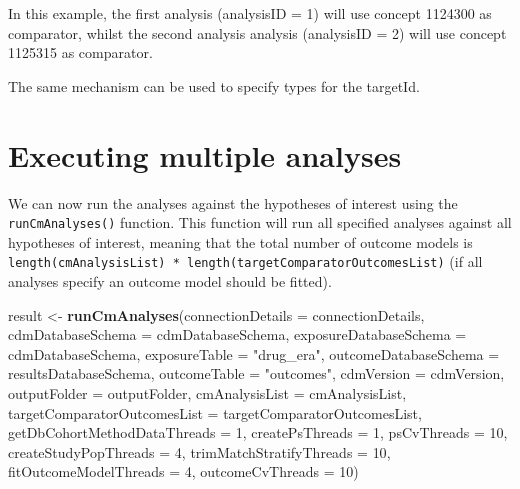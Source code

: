 \documentclass[
]{article}
\newenvironment{Shaded}{\begin{snugshade}}{\end{snugshade}}
\newcommand{\DataTypeTok}[1]{\textcolor[rgb]{0.13,0.29,0.53}{#1}}
\newcommand{\DecValTok}[1]{\textcolor[rgb]{0.00,0.00,0.81}{#1}}
\newcommand{\KeywordTok}[1]{\textcolor[rgb]{0.13,0.29,0.53}{\textbf{#1}}}
\newcommand{\NormalTok}[1]{#1}
\newcommand{\StringTok}[1]{\textcolor[rgb]{0.31,0.60,0.02}{#1}}
\begin{document}
In this example, the first analysis (analysisID = 1) will use concept
1124300 as comparator, whilst the second analysis analysis (analysisID =
2) will use concept 1125315 as comparator.

The same mechanism can be used to specify types for the targetId.

\hypertarget{executing-multiple-analyses}{%
\section{Executing multiple
analyses}\label{executing-multiple-analyses}}

We can now run the analyses against the hypotheses of interest using the
\texttt{runCmAnalyses()} function. This function will run all specified
analyses against all hypotheses of interest, meaning that the total
number of outcome models is
\texttt{length(cmAnalysisList)\ *\ length(targetComparatorOutcomesList)}
(if all analyses specify an outcome model should be fitted).

\begin{Shaded}
\begin{Highlighting}[]
\NormalTok{result <-}\StringTok{ }\KeywordTok{runCmAnalyses}\NormalTok{(}\DataTypeTok{connectionDetails =}\NormalTok{ connectionDetails,}
                        \DataTypeTok{cdmDatabaseSchema =}\NormalTok{ cdmDatabaseSchema,}
                        \DataTypeTok{exposureDatabaseSchema =}\NormalTok{ cdmDatabaseSchema,}
                        \DataTypeTok{exposureTable =} \StringTok{"drug_era"}\NormalTok{,}
                        \DataTypeTok{outcomeDatabaseSchema =}\NormalTok{ resultsDatabaseSchema,}
                        \DataTypeTok{outcomeTable =} \StringTok{"outcomes"}\NormalTok{,}
                        \DataTypeTok{cdmVersion =}\NormalTok{ cdmVersion,}
                        \DataTypeTok{outputFolder =}\NormalTok{ outputFolder,}
                        \DataTypeTok{cmAnalysisList =}\NormalTok{ cmAnalysisList,}
                        \DataTypeTok{targetComparatorOutcomesList =}\NormalTok{ targetComparatorOutcomesList,}
                        \DataTypeTok{getDbCohortMethodDataThreads =} \DecValTok{1}\NormalTok{,}
                        \DataTypeTok{createPsThreads =} \DecValTok{1}\NormalTok{,}
                        \DataTypeTok{psCvThreads =} \DecValTok{10}\NormalTok{,}
                        \DataTypeTok{createStudyPopThreads =} \DecValTok{4}\NormalTok{,}
                        \DataTypeTok{trimMatchStratifyThreads =} \DecValTok{10}\NormalTok{,}
                        \DataTypeTok{fitOutcomeModelThreads =} \DecValTok{4}\NormalTok{,}
                        \DataTypeTok{outcomeCvThreads =} \DecValTok{10}\NormalTok{)}
\end{Highlighting}
\end{Shaded}
\end{document}
